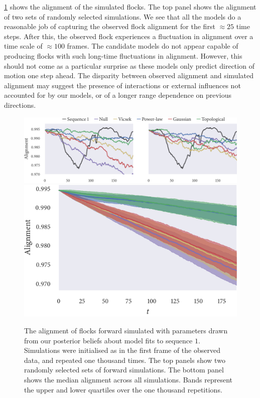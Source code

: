 \cref{fig:checks_seq1} shows the alignment of the simulated flocks. The top
panel shows the alignment of two sets of randomly selected simulations. We see
that all the models do a reasonable job of capturing the observed flock
alignment for the first $\approx25$ time steps. After this, the observed flock
experiences a fluctuation in alignment over a time scale of $\approx100$
frames. The candidate models do not appear capable of producing flocks with
such long-time fluctuations in alignment. However, this should not come as a
particular surprise as these models only predict direction of motion one step
ahead. The disparity between observed alignment and simulated alignment may
suggest the presence of interactions or external influences not accounted for
by our models, or of a longer range dependence on previous directions.

\begin{figure}[tbp]
  \includegraphics{alignment/alignment_single_1.pdf}\vspace{1em}\\
  \includegraphics{alignment/alignment_ensemble_1.pdf}
  \caption{The alignment of flocks forward simulated with parameters drawn from
    our posterior beliefs about model fits to sequence $1$. Simulations were
    initialised as in the first frame of the observed data, and repeated one
    thousand times. The top panels show two randomly selected sets of forward
    simulations. The bottom panel shows the median alignment across all
    simulations. Bands represent the upper and lower quartiles over the one
    thousand repetitions.}
  \label{fig:checks_seq1}
\end{figure}

